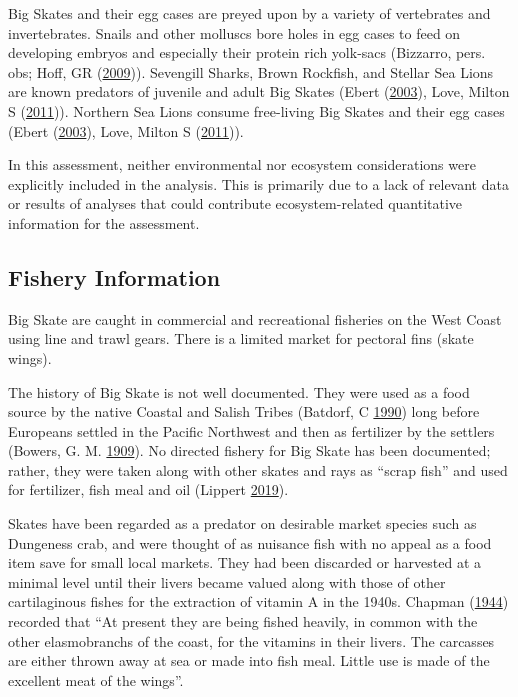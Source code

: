 \documentclass[12pt,]{article}
\begin{document}
Big Skates and their egg cases are preyed upon by a variety of
vertebrates and invertebrates. Snails and other molluscs bore holes in
egg cases to feed on developing embryos and especially their protein
rich yolk-sacs (Bizzarro, pers. obs; Hoff, GR
(\protect\hyperlink{ref-Hoff2009}{2009})). Sevengill Sharks, Brown
Rockfish, and Stellar Sea Lions are known predators of juvenile and
adult Big Skates (Ebert (\protect\hyperlink{ref-Ebert2003}{2003}), Love,
Milton S (\protect\hyperlink{ref-Love2011}{2011})). Northern Sea Lions
consume free-living Big Skates and their egg cases (Ebert
(\protect\hyperlink{ref-Ebert2003}{2003}), Love, Milton S
(\protect\hyperlink{ref-Love2011}{2011})).

In this assessment, neither environmental nor ecosystem considerations
were explicitly included in the analysis. This is primarily due to a
lack of relevant data or results of analyses that could contribute
ecosystem-related quantitative information for the assessment.

\hypertarget{fishery-information}{%
\subsection{Fishery Information}\label{fishery-information}}

Big Skate are caught in commercial and recreational fisheries on the
West Coast using line and trawl gears. There is a limited market for
pectoral fins (skate wings).

The history of Big Skate is not well documented. They were used as a
food source by the native Coastal and Salish Tribes (Batdorf, C
\protect\hyperlink{ref-Batdorf1990}{1990}) long before Europeans settled
in the Pacific Northwest and then as fertilizer by the settlers (Bowers,
G. M. \protect\hyperlink{ref-Bowers1909}{1909}). No directed fishery for
Big Skate has been documented; rather, they were taken along with other
skates and rays as ``scrap fish'' and used for fertilizer, fish meal and
oil (Lippert \protect\hyperlink{ref-GregLippert}{2019}).

Skates have been regarded as a predator on desirable market species such
as Dungeness crab, and were thought of as nuisance fish with no appeal
as a food item save for small local markets. They had been discarded or
harvested at a minimal level until their livers became valued along with
those of other cartilaginous fishes for the extraction of vitamin A in
the 1940s. Chapman (\protect\hyperlink{ref-Chapman1944}{1944}) recorded
that ``At present they are being fished heavily, in common with the
other elasmobranchs of the coast, for the vitamins in their livers. The
carcasses are either thrown away at sea or made into fish meal. Little
use is made of the excellent meat of the wings''.
\end{document}

